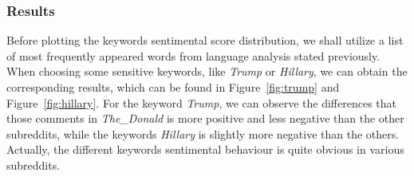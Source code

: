 \documentclass[runningheads,a4paper]{llncs}
\begin{document}
	\subsubsection{Results} Before plotting the keywords sentimental score distribution, we shall utilize a list of most frequently appeared words from language analysis stated previously. When choosing some sensitive keywords, like \textit{Trump} or \textit{Hillary}, we can obtain the corresponding results, which can be found in Figure~\ref{fig:trump} and Figure~\ref{fig:hillary}. For the keyword \textit{Trump}, we can observe the differences that those comments in \textit{The\_Donald} is more positive and less negative than the other subreddits, while the keywords \textit{Hillary} is slightly more negative than the others. Actually, the different keywords sentimental behaviour is quite obvious in various subreddits.
	
\end{document}

